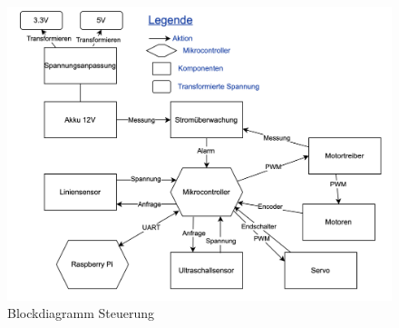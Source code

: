 \begin{figure}[H]
    \centering
    \includegraphics[width=1\linewidth]{img/Blockdiagramm-ET-drawio.drawio-2.png}
    \caption{Blockdiagramm Steuerung}
    \label{Blockdiagramm Steuerung}
\end{figure}


